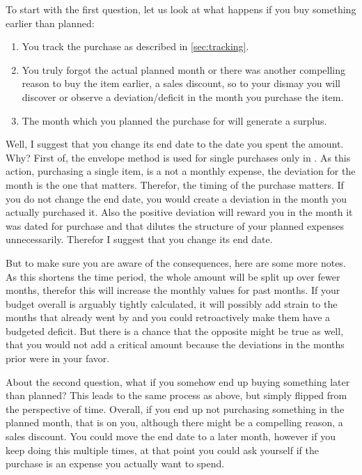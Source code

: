 To start with the first question, let us look at what happens if you buy something earlier than planned:
\begin{enumerate}
	\item You track the purchase as described in \autoref{sec:tracking}.
	\item You truly forgot the actual planned month or there was another compelling reason to buy the item earlier, \eg a sales discount, so to your dismay you will discover or observe a deviation/deficit in the month you purchase the item.
	\item The month which you planned the purchase for will generate a surplus.
\end{enumerate}

Well, I suggest that you change its end date to the date you spent the amount.
Why?
First of, the envelope method is used for single purchases only in \tfn.
As this action, \ie purchasing a single item, is a not a monthly expense, the deviation for the month is the one that matters.
Therefor, the timing of the purchase matters.
If you do not change the end date, you would create a deviation in the month you actually purchased it.
Also the positive deviation will reward you in the month it was dated for purchase and that dilutes the structure of your planned expenses unnecessarily.
Therefor I suggest that you change its end date.

But to make sure you are aware of the consequences, here are some more notes.
As this shortens the time period, the whole amount will be split up over fewer months, therefor this will increase the monthly values for past months.
If your budget overall is arguably tightly calculated, it will possibly add strain to the months that already went by and you could retroactively make them have a budgeted deficit.
But there is a chance that the opposite might be true as well, that you would not add a critical amount because the deviations in the months prior were in your favor.

About the second question, what if you somehow end up buying something later than planned?
This leads to the same process as above, but simply flipped from the perspective of time.
Overall, if you end up not purchasing something in the planned month, that is on you, although there might be a compelling reason, \eg a sales discount.
You could move the end date to a later month, however if you keep doing this multiple times, at that point you could ask yourself if the purchase is an expense you actually want to spend.

